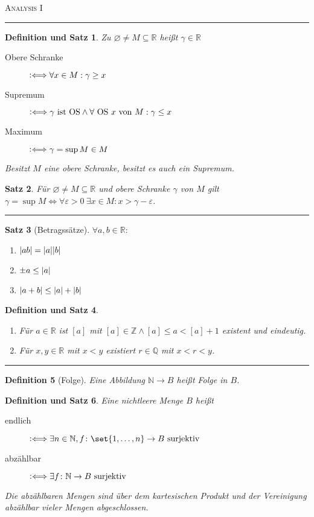 \documentclass[a4paper]{article}
\newcounter{Sec}
\theoremstyle{marginbreak}
\newtheorem{definition}{Definition}[Sec]
\newtheorem{satz}[definition]{Satz}
\newtheorem{defsatz}[definition]{Definition und Satz}
\newcommand{\sep}{%
	\rule{\textwidth}{0.3pt}%
	\stepcounter{Sec}%
	}
\newcommand{\defiff}{\mathrel{\vcentcolon\Longleftrightarrow}}
\begin{document}
	\textsc{Analysis I}

	\sep
	\begin{defsatz}
		Zu $\varnothing\neq M\subseteq\mathbb{R}$ heißt $\gamma\in\mathbb{R}$
		\begin{description}
			\item[Obere Schranke] $\defiff \forall x\in M: \gamma\geq x$
			\item[Supremum] $\defiff \gamma~\text{ist OS} \wedge \forall~\text{OS $x$ von $M$}: \gamma\leq x$
			\item[Maximum] $\defiff \gamma = \sup M\in M$
		\end{description}
		Besitzt $M$ eine obere Schranke, besitzt es auch ein Supremum.
	\end{defsatz}
	\begin{satz}
		Für $\varnothing\neq M\subseteq\mathbb{R}$ und obere Schranke $\gamma$ von $M$ gilt
		$\gamma = \sup M\iff\forall\varepsilon>0~\exists x\in M:x>\gamma-\varepsilon$.
	\end{satz}
	\sep
	\begin{satz}[Betragssätze]
		$\forall a,b\in\mathbb{R}:$
		\begin{enumerate}[label=(\alph*)]
			\item $\abs{ab}=\abs{a}\abs{b}$
			\item $\pm a\leq\abs{a}$
			\item $\abs{a+b}\leq\abs{a}+\abs{b}$
		\end{enumerate}
	\end{satz}
	\begin{defsatz}
		\begin{enumerate}[label=(\alph*)]
			\item Für $a\in\mathbb{R}$ ist $[a]$ mit $[a]\in\mathbb{Z}\wedge [a]\leq a<[a]+1$ existent und eindeutig.
			\item Für $x,y\in\mathbb{R}$ mit $x<y$ existiert $r\in\mathbb{Q}$ mit $x<r<y$.
		\end{enumerate}
	\end{defsatz}
	\sep
	\begin{definition}[Folge]
		Eine Abbildung $\mathbb{N}\to B$ heißt Folge in $B$.
	\end{definition}
	\begin{defsatz}
		Eine nichtleere Menge $B$ heißt
		\begin{description}
			\item[endlich] $\defiff\exists n\in\mathbb{N},f\colon \set{1,\ldots,n}\to B~\text{surjektiv}$
			\item[abzählbar] $\defiff\exists f\colon\mathbb{N}\to B~\text{surjektiv}$
		\end{description}
		Die abzählbaren Mengen sind über dem kartesischen Produkt und der
		Vereinigung abzählbar vieler Mengen abgeschlossen.
	\end{defsatz}
\end{document}
